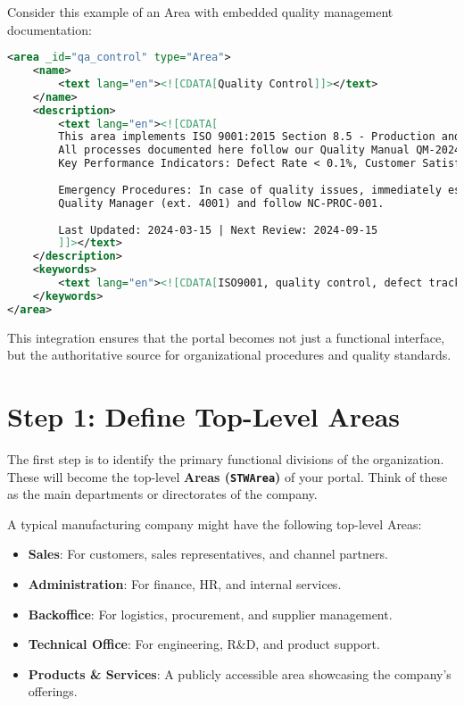 Consider this example of an Area with embedded quality management documentation:

\begin{lstlisting}[language=XML,caption={Area with Quality Management Documentation},label={lst:quality-area}]
<area _id="qa_control" type="Area">
    <name>
        <text lang="en"><![CDATA[Quality Control]]></text>
    </name>
    <description>
        <text lang="en"><![CDATA[
        This area implements ISO 9001:2015 Section 8.5 - Production and Service Provision.
        All processes documented here follow our Quality Manual QM-2024-Rev3.
        Key Performance Indicators: Defect Rate < 0.1%, Customer Satisfaction > 95%.
        
        Emergency Procedures: In case of quality issues, immediately escalate to 
        Quality Manager (ext. 4001) and follow NC-PROC-001.
        
        Last Updated: 2024-03-15 | Next Review: 2024-09-15
        ]]></text>
    </description>
    <keywords>
        <text lang="en"><![CDATA[ISO9001, quality control, defect tracking, KPI, emergency procedures, compliance, audit]]></text>
    </keywords>
</area>
\end{lstlisting}

This integration ensures that the portal becomes not just a functional interface, but the authoritative source for organizational procedures and quality standards.

\section{Step 1: Define Top-Level Areas}
\label{sec:define-areas}

The first step is to identify the primary functional divisions of the organization. These will become the top-level \textbf{Areas (\texttt{STWArea})} of your portal. Think of these as the main departments or directorates of the company.

A typical manufacturing company might have the following top-level Areas:
\begin{itemize}
    \item \textbf{Sales}: For customers, sales representatives, and channel partners.
    \item \textbf{Administration}: For finance, HR, and internal services.
    \item \textbf{Backoffice}: For logistics, procurement, and supplier management.
    \item \textbf{Technical Office}: For engineering, R\&D, and product support.
    \item \textbf{Products \& Services}: A publicly accessible area showcasing the company's offerings.
\end{itemize}


